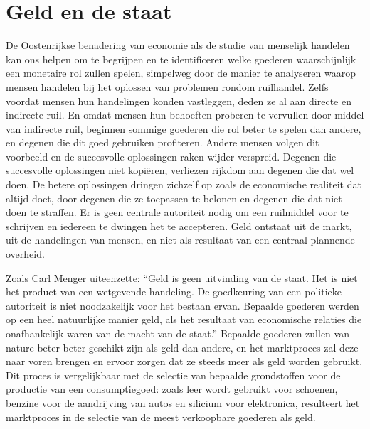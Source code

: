 \hypertarget{geld-en-de-staat}{%
\section{Geld en de staat}\label{geld-en-de-staat}}

De Oostenrijkse benadering van economie als de studie van menselijk handelen kan ons helpen om te begrijpen en te identificeren welke goederen waarschijnlijk een monetaire rol zullen spelen, simpelweg door de manier te analyseren waarop mensen handelen bij het oplossen van problemen rondom ruilhandel. Zelfs voordat mensen hun handelingen konden vastleggen, deden ze al aan directe en indirecte ruil. En omdat mensen hun behoeften proberen te vervullen door middel van indirecte ruil, beginnen sommige goederen die rol beter te spelen dan andere, en degenen die dit goed gebruiken profiteren. Andere mensen volgen dit voorbeeld en de succesvolle oplossingen raken wijder verspreid. Degenen die succesvolle oplossingen niet kopiëren, verliezen rijkdom aan degenen die dat wel doen. De betere oplossingen dringen zichzelf op zoals de economische realiteit dat altijd doet, door degenen die ze toepassen te belonen en degenen die dat niet doen te straffen. Er is geen centrale autoriteit nodig om een ruilmiddel voor te schrijven en iedereen te dwingen het te accepteren. Geld ontstaat uit de markt, uit de handelingen van mensen, en niet als resultaat van een centraal plannende overheid.

Zoals Carl Menger uiteenzette: ``Geld is geen uitvinding van de staat. Het is niet het product van een wetgevende handeling. De goedkeuring van een politieke autoriteit is niet noodzakelijk voor het bestaan ervan. Bepaalde goederen werden op een heel natuurlijke manier geld, als het resultaat van economische relaties die onafhankelijk waren van de macht van de staat.''\autocite{115} Bepaalde goederen zullen van nature beter beter geschikt zijn als geld dan andere, en het marktproces zal deze naar voren brengen en ervoor zorgen dat ze steeds meer als geld worden gebruikt. Dit proces is vergelijkbaar met de selectie van bepaalde grondstoffen voor de productie van een consumptiegoed: zoals leer wordt gebruikt voor schoenen, benzine voor de aandrijving van auto\textquotesingle s en silicium voor elektronica, resulteert het marktproces in de selectie van de meest verkoopbare goederen als geld.

